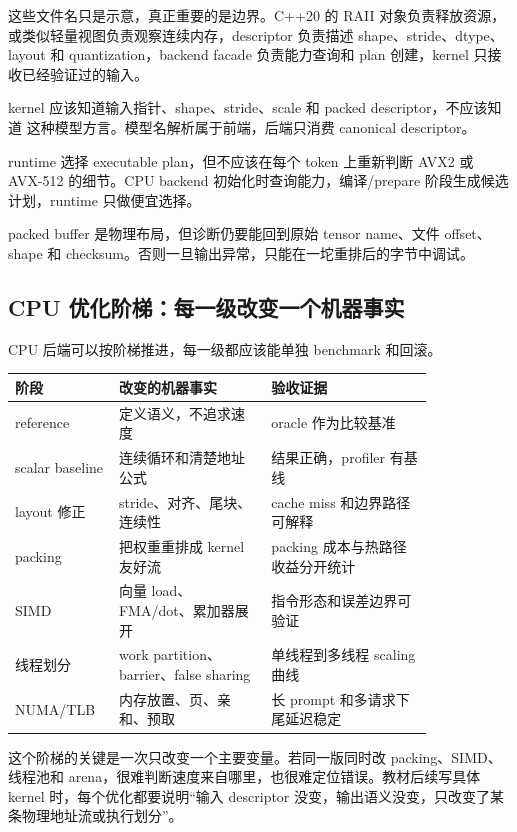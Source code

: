 这些文件名只是示意，真正重要的是边界。C++20 的 RAII 对象负责释放资源， 或类似轻量视图负责观察连续内存，descriptor 负责描述 shape、stride、dtype、layout 和 quantization，backend facade 负责能力查询和 plan 创建，kernel 只接收已经验证过的输入。

 kernel 应该知道输入指针、shape、stride、scale 和 packed descriptor，不应该知道  这种模型方言。模型名解析属于前端，后端只消费 canonical descriptor。

 runtime 选择 executable plan，但不应该在每个 token 上重新判断 AVX2 或 AVX-512 的细节。CPU backend 初始化时查询能力，编译/prepare 阶段生成候选计划，runtime 只做便宜选择。

 packed buffer 是物理布局，但诊断仍要能回到原始 tensor name、文件 offset、shape 和 checksum。否则一旦输出异常，只能在一坨重排后的字节中调试。

\subsection{CPU 优化阶梯：每一级改变一个机器事实}

CPU 后端可以按阶梯推进，每一级都应该能单独 benchmark 和回滚。

\begin{center}
\begin{tabular}{p{0.17\linewidth}p{0.32\linewidth}p{0.34\linewidth}}
\toprule
阶段 & 改变的机器事实 & 验收证据 \\
\midrule
reference & 定义语义，不追求速度 & oracle 作为比较基准 \\
scalar baseline & 连续循环和清楚地址公式 & 结果正确，profiler 有基线 \\
layout 修正 & stride、对齐、尾块、连续性 & cache miss 和边界路径可解释 \\
packing & 把权重重排成 kernel 友好流 & packing 成本与热路径收益分开统计 \\
SIMD & 向量 load、FMA/dot、累加器展开 & 指令形态和误差边界可验证 \\
线程划分 & work partition、barrier、false sharing & 单线程到多线程 scaling 曲线 \\
NUMA/TLB & 内存放置、页、亲和、预取 & 长 prompt 和多请求下尾延迟稳定 \\
\bottomrule
\end{tabular}
\end{center}

这个阶梯的关键是一次只改变一个主要变量。若同一版同时改 packing、SIMD、线程池和 arena，很难判断速度来自哪里，也很难定位错误。教材后续写具体 kernel 时，每个优化都要说明“输入 descriptor 没变，输出语义没变，只改变了某条物理地址流或执行划分”。

